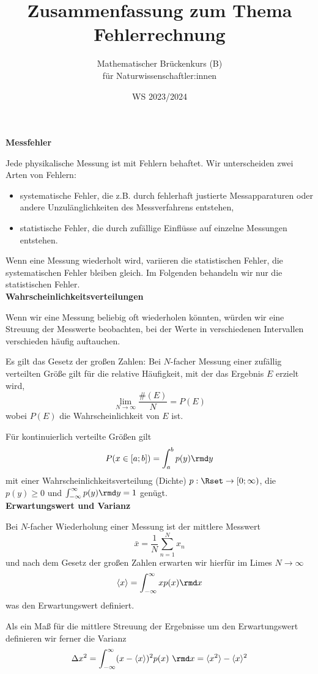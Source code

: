 \documentclass[a4paper,10pt]{article}
\title{Zusammenfassung zum Thema Fehlerrechnung}
\author{Mathematischer Brückenkurs (B)\\für Naturwissenschaftler:innen}
\date{WS 2023/2024}
\begin{document}
\parindent0pt
\maketitle

{\bf Messfehler}

Jede physikalische Messung ist mit Fehlern behaftet.
Wir unterscheiden zwei Arten von Fehlern:
\begin{itemize}
\item systematische Fehler, die z.B. durch fehlerhaft justierte Messapparaturen
      oder andere Unzulänglichkeiten des Messverfahrens entstehen,
\item statistische Fehler, die durch zufällige Einflüsse auf einzelne
      Messungen entstehen.
\end{itemize}
Wenn eine Messung wiederholt wird, variieren die statistischen Fehler,
die systematischen Fehler bleiben gleich.
Im Folgenden behandeln wir nur die statistischen Fehler.\\

{\bf Wahrscheinlichkeitsverteilungen}

Wenn wir eine Messung beliebig oft wiederholen könnten, würden wir
eine Streuung der Messwerte beobachten, bei der Werte in verschiedenen
Intervallen verschieden häufig auftauchen.

Es gilt das Gesetz der großen Zahlen:
Bei $N$-facher Messung einer zufällig verteilten Größe gilt
für die relative Häufigkeit, mit der das Ergebnis $E$ erzielt wird,
\[
\lim\limits_{N\to\infty} \frac{\#(E)}{N} = P(E)
\]
wobei $P(E)$ die Wahrscheinlichkeit von $E$ ist.

Für kontinuierlich verteilte Größen gilt
\[
P(x\in[a;b]) = \int_a^b p(y)\rmd y
\]
mit einer Wahrscheinlichkeitsverteilung (Dichte) $p:\Rset\to[0;\infty)$,
die $p(y)\ge 0$ und $\int_{-\infty}^\infty p(y)\rmd y=1$ genügt.\\

{\bf Erwartungswert und Varianz}

Bei $N$-facher Wiederholung einer Messung ist der mittlere Messwert
\[
\bar{x}=\frac{1}{N}\sum_{n=1}^N x_n
\]
und nach dem Gesetz der großen Zahlen erwarten wir hierfür im Limes
$N\to\infty$
\[
\langle x\rangle = \int_{-\infty}^\infty x p(x)\rmd x
\]
was den Erwartungswert definiert.

Als ein Maß für die mittlere Streuung der Ergebnisse um den Erwartungswert
definieren wir ferner die Varianz
\[
\Delta x^2 = \int_{-\infty}^\infty (x-\langle x\rangle)^2 p(x)~\rmd x
           = \langle x^2\rangle-\langle x\rangle^2
\]
\pagebreak
\end{document}
